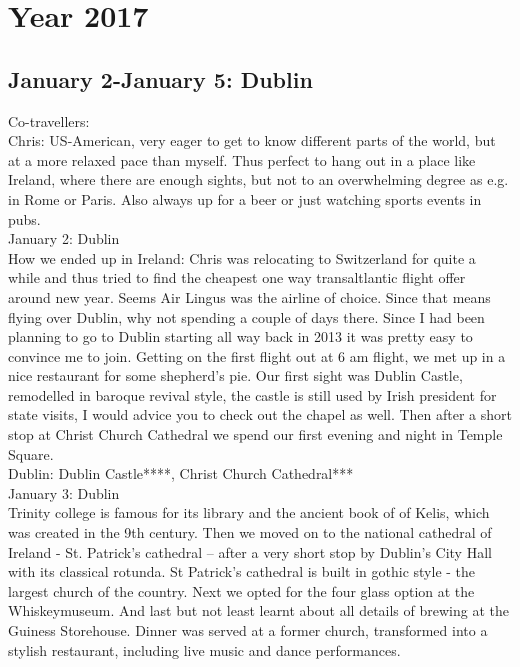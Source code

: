 \chapter{Year 2017}
\label{2017}

\section{January 2-January 5: Dublin}
\label{2017: Ireland}

Co-travellers: \\
Chris: US-American, very eager to get to know different parts of the world, but at a more relaxed pace than myself. Thus perfect to hang out in a place like Ireland, where there are enough sights, but not to an overwhelming degree as e.g. in Rome or Paris. Also always up for a beer or just watching sports events in pubs.\\

January 2: Dublin\\
How we ended up in Ireland: Chris was relocating to Switzerland for quite a while and thus tried to find the cheapest one way transaltlantic flight offer around new year. Seems Air Lingus was the airline of choice. Since that means flying over Dublin, why not spending a couple of days there. Since I had been planning to go to Dublin starting all way back in 2013 it was pretty easy to convince me to join. Getting on the first flight out at 6 am flight, we met up in a nice restaurant for some shepherd's pie. Our first sight was Dublin Castle, remodelled in baroque revival style, the castle is still used by Irish president for state visits, I would advice you to check out the chapel as well. Then after a short stop at Christ Church Cathedral we spend our first evening and night in Temple Square.\\

Dublin: Dublin Castle****, Christ Church Cathedral***\\

January 3: Dublin\\
Trinity college is famous for its library and the ancient book of of Kelis, which was created in the 9th century.
Then we moved on to the national cathedral of Ireland - St. Patrick's cathedral -- after a very short stop by Dublin's City Hall with its classical rotunda. St Patrick's cathedral is built in gothic style - the largest church of the country. Next we opted for the four glass option at the Whiskeymuseum. And last but not least learnt about all details of brewing at the Guiness Storehouse. Dinner was served at a former church, transformed into a stylish restaurant, including live music and dance performances.\\

